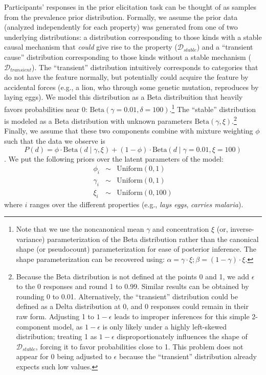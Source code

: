 \documentclass[english,,man,floatsintext]{apa6}
\let\rmarkdownfootnote\footnote%
\def\footnote{\protect\rmarkdownfootnote}
\theoremstyle{definition}
\theoremstyle{definition}
\theoremstyle{definition}
\theoremstyle{remark}
\begin{document}
Participants' responses in the prior elicitation task can be thought of
as samples from the prevalence prior distribution. Formally, we assume
the prior data (analyzed independently for each property) was generated
from one of two underlying distributions: a distribution corresponding
to those kinds with a stable causal mechanism that \emph{could} give
rise to the property (\(\mathcal{D}_{stable}\)) and a \enquote{transient
cause} distribution corresponding to those kinds without a stable
mechanism (\(\mathcal{D}_{transient}\)). The \enquote{transient}
distribution intuitively corresponds to categories that do not have the
feature normally, but potentially could acquire the feature by
accidental forces (e.g., a lion, who through some genetic mutation,
reproduces by laying eggs). We model this distribution as a Beta
distribuition that heavily favors probabilities near 0:
\(\text{Beta}(\gamma = 0.01, \delta = 100)\).\footnote{Note that we use
  the noncanonical mean \(\gamma\) and concentration \(\xi\) (or,
  inverse-variance) parameterization of the Beta distribution rather
  than the canonical shape (or pseudocount) parameterization for ease of
  posterior inference. The shape parameterization can be recovered
  using: \(\alpha = \gamma \cdot \xi; \beta = (1 - \gamma) \cdot \xi\).}
The \enquote{stable} distribution is modeled as a Beta distribution with
unknown parameters \(\text{Beta}(\gamma, \xi)\).\footnote{Because the
  Beta distribution is not defined at the points 0 and 1, we add
  \(\epsilon\) to the 0 responses and round 1 to 0.99. Similar results
  can be obtained by rounding 0 to 0.01. Alternatively, the
  \enquote{transient} distribution could be defined as a Delta
  distribution at 0, and 0 responses could remain in their raw form.
  Adjusting 1 to \(1- \epsilon\) leads to improper inferences for this
  simple 2-component model, as \(1 - \epsilon\) is only likely under a
  highly left-skewed distribution; treating 1 as \(1- \epsilon\)
  disproportionately influences the shape of \(\mathcal{D}_{stable}\),
  forcing it to favor probabilities close to 1. This problem does not
  appear for 0 being adjusted to \(\epsilon\) because the
  \enquote{transient} distribution already expects such low values.}
Finally, we assume that these two components combine with mixture
weighting \(\phi\) such that the data we observe is
\[P(d) = \phi\cdot \text{Beta} (d \mid \gamma, \xi) + (1 -  \phi) \cdot \text{Beta}(d \mid \gamma = 0.01, \xi = 100) \].
We put the following priors over the latent parameters of the model:
\begin{eqnarray*}
\phi_i & \sim & \text{Uniform}(0, 1) \\
\gamma_i & \sim & \text{Uniform}(0, 1) \\
\xi_i & \sim & \text{Uniform}(0, 100)
\end{eqnarray*} where \(i\) ranges over the different properties (e.g.,
\emph{lays eggs}, \emph{carries malaria}).
\end{document}
